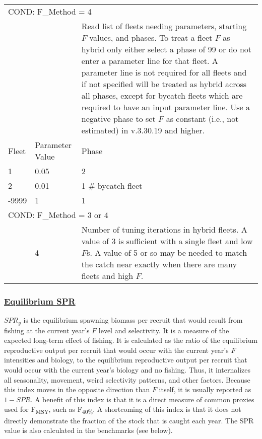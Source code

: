 \begin{longtable}{p{1cm} p{3cm} p{11cm}}
	\multicolumn{3}{l}{COND: F\_Method = 4} \Tstrut\\
	& & Read list of fleets needing parameters, starting $F$ values, and phases. To treat a fleet $F$ as hybrid only either select a phase of 99 or do not enter a parameter line for that fleet. A parameter line is not required for all fleets and if not specified will be treated as hybrid across all phases, except for bycatch fleets which are required to have an input parameter line. Use a negative phase to set $F$ as constant (i.e., not estimated) in v.3.30.19 and higher. \Tstrut\\
	Fleet & Parameter Value & Phase \Tstrut\\
	1 & 0.05 & 2 \\
	2 & 0.01 & 1 \# bycatch fleet \\
	-9999 & 1 & 1 \Bstrut\\
	\hline
 
	\multicolumn{3}{l}{COND: F\_Method = 3 or 4} \Tstrut\\
	& 4 & Number of tuning iterations in hybrid fleets. A value of 3 is sufficient with a single fleet and low $F$s. A value of 5 or so may be needed to match the catch near exactly when there are many fleets and high $F$. \Bstrut\\
	\hline
\end{longtable}

\hypertarget{EquilSPR}{}
\subsubsection[Equilibrium SPR]{\protect\hyperlink{EquilSPR}{Equilibrium SPR}}
$SPR_y$ is the equilibrium spawning biomass per recruit that would result from fishing at the current year’s $F$ level and selectivity. It is a measure of the expected long-term effect of fishing. It is calculated as the ratio of the equilibrium reproductive output per recruit that would occur with the current year's $F$ intensities and biology, to the equilibrium reproductive output per recruit that would occur with the current year's biology and no fishing. Thus, it internalizes all seasonality, movement, weird selectivity patterns, and other factors. Because this index moves in the opposite direction than $F$ itself, it is usually reported as $1-SPR$. A benefit of this index is that it is a direct measure of common proxies used for F\textsubscript{MSY}, such as F\textsubscript{40\%}. A shortcoming of this index is that it does not directly demonstrate the fraction of the stock that is caught each year. The SPR value is also calculated in the benchmarks (see below). 

